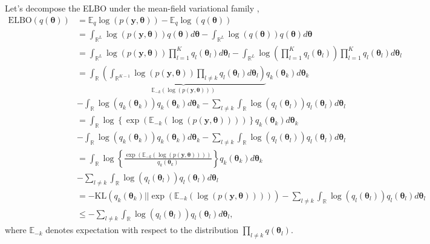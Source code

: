Let's decompose the ELBO under the mean-field variational family \cite{nguyen2023depth},
\begin{align*}
		\text{ELBO}(q(\boldsymbol{\theta}))&=\mathbb{E}_q\log(p(\boldsymbol{y}, \boldsymbol{\theta}))-\mathbb{E}_q\log(q(\boldsymbol{\theta}))\\
	&=\int_{\mathbb{R}^L} \log(p(\boldsymbol{y}, \boldsymbol{\theta}))q(\boldsymbol{\theta})d\boldsymbol{\theta}-\int_{\mathbb{R}^L}\log(q(\boldsymbol{\theta}))q(\boldsymbol{\theta})d\boldsymbol{\theta}\\
	&=\int_{\mathbb{R}^L} \log\left(p(\boldsymbol{y}, \boldsymbol{\theta})\right)\prod_{l=1}^K q_l(\boldsymbol{\theta}_l)d\boldsymbol{\theta}_l-\int_{\mathbb{R}^L}\log\left(\prod_{l=1}^K q_l(\boldsymbol{\theta}_l)\right)\prod_{l=1}^K q_l(\boldsymbol{\theta}_l)d\boldsymbol{\theta}_l\\
	&=\int_{\mathbb{R}} \underbrace{\left(\int_{\mathbb{R}^{K-1}}\log\left(p(\boldsymbol{y}, \boldsymbol{\theta})\right)\prod_{l\neq k} q_l(\boldsymbol{\theta}_l)d\boldsymbol{\theta}_l\right)}_{\mathbb{E}_{-k}(\log\left(p(\boldsymbol{y}, \boldsymbol{\theta})\right))}q_k(\boldsymbol{\theta}_k)d\boldsymbol{\theta}_k\\ 
	&-\int_{\mathbb{R}}\log(q_k(\boldsymbol{\theta}_k))q_k(\boldsymbol{\theta}_k)d\boldsymbol{\theta}_k-\sum_{l\neq k}\int_{\mathbb{R}}\log(q_l(\boldsymbol{\theta}_l))q_l(\boldsymbol{\theta}_l)d\boldsymbol{\theta}_l\\
	&=\int_{\mathbb{R}}\log\left\{\exp\left(\mathbb{E}_{-k}(\log\left(p(\boldsymbol{y}, \boldsymbol{\theta})\right))\right)\right\}q_k(\boldsymbol{\theta}_k)d\boldsymbol{\theta}_k\\ 
	&-\int_{\mathbb{R}}\log(q_k(\boldsymbol{\theta}_k))q_k(\boldsymbol{\theta}_k)d\boldsymbol{\theta}_k-\sum_{l\neq k}\int_{\mathbb{R}}\log(q_l(\boldsymbol{\theta}_l))q_l(\boldsymbol{\theta}_l)d\boldsymbol{\theta}_l\\
	&=\int_{\mathbb{R}}\log\left\{\frac{\exp\left(\mathbb{E}_{-k}(\log\left(p(\boldsymbol{y}, \boldsymbol{\theta})\right))\right)}{q_k(\boldsymbol{\theta}_k)}\right\}q_k(\boldsymbol{\theta}_k)d\boldsymbol{\theta}_k\\
	&-\sum_{l\neq k}\int_{\mathbb{R}}\log(q_l(\boldsymbol{\theta}_l))q_l(\boldsymbol{\theta}_l)d\boldsymbol{\theta}_l\\ 
	&=-\text{KL}(q_k(\boldsymbol{\theta}_k)||\exp\left(\mathbb{E}_{-k}(\log\left(p(\boldsymbol{y}, \boldsymbol{\theta})\right))\right))-\sum_{l\neq k}\int_{\mathbb{R}}\log(q_l(\boldsymbol{\theta}_l))q_l(\boldsymbol{\theta}_l)d\boldsymbol{\theta}_l\\
	&\leq -\sum_{l\neq k}\int_{\mathbb{R}}\log(q_l(\boldsymbol{\theta}_l))q_l(\boldsymbol{\theta}_l)d\boldsymbol{\theta}_l,
\end{align*} 
where $\mathbb{E}_{-k}$ denotes expectation with respect to the distribution $\prod_{l\neq k}q(\boldsymbol{\theta}_l)$.

